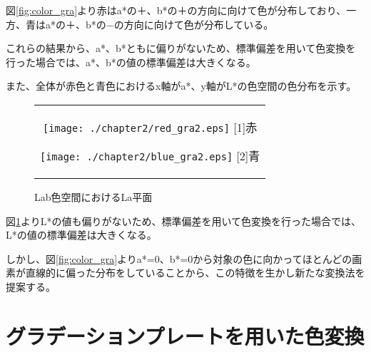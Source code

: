 図\ref{fig:color_gra}より赤はa*の＋、b*の＋の方向に向けて色が分布しており、一方、青はa*の＋、b*の−の方向に向けて色が分布している。\par
これらの結果から、a*、b*ともに偏りがないため、標準偏差を用いて色変換を行った場合では、a*、b*の値の標準偏差は大きくなる。\par

また、全体が赤色と青色におけるx軸がa*、y軸がL*の色空間の色分布を示す。\par
\begin{figure}[htbp]
  \begin{center}
    \begin{tabular}{c}

      \begin{minipage}{0.33\hsize}
        \begin{center}
          \texttt{[image: ./chapter2/red\_gra2.eps]}
          \hspace{1.6cm} [1]赤
        \end{center}
      \end{minipage}

      \begin{minipage}{0.33\hsize}
        \begin{center}
          \texttt{[image: ./chapter2/blue\_gra2.eps]}
          \hspace{1.6cm} [2]青
        \end{center}
      \end{minipage}

    \end{tabular}
    \caption{Lab色空間におけるLa平面}
    \label{fig:color_gra2}
  \end{center}
\end{figure}
図\ref{fig:color_gra2}よりL*の値も偏りがないため、標準偏差を用いて色変換を行った場合では、L*の値の標準偏差は大きくなる。\par
しかし、図\ref{fig:color_gra}よりa*=0、b*=0から対象の色に向かってほとんどの画素が直線的に偏った分布をしていることから、この特徴を生かし新たな変換法を提案する。\par

\newpage
\section{グラデーションプレートを用いた色変換}

